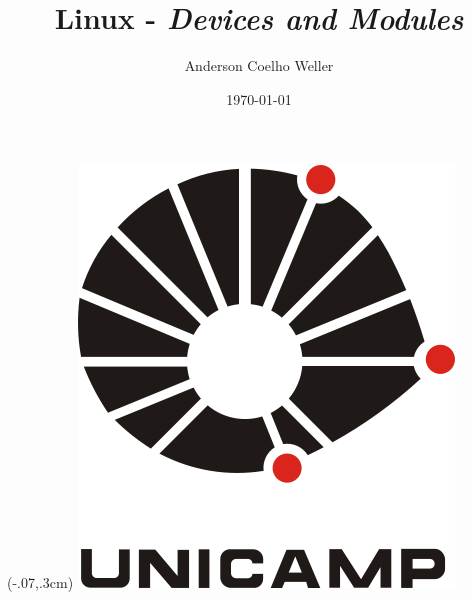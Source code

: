 \documentclass[hyphens]{beamer}
\title[\textit{Devices and Modules}]{Linux - \textit{Devices and Modules}}
\author[Anderson Weller]{Anderson Coelho Weller}
\institute[Unicamp]{Universidade Estadual de Campinas\\Instituto de Computação}
\date{\today}
\begin{document}
{
	\begin{frame}

		\titlepage

		\begin{textblock*}{100mm}(-.07\textwidth,.3cm)
			\includegraphics[scale=.056]{uec}
		\end{textblock*}
		
	\end{frame}
}






\end{document}
